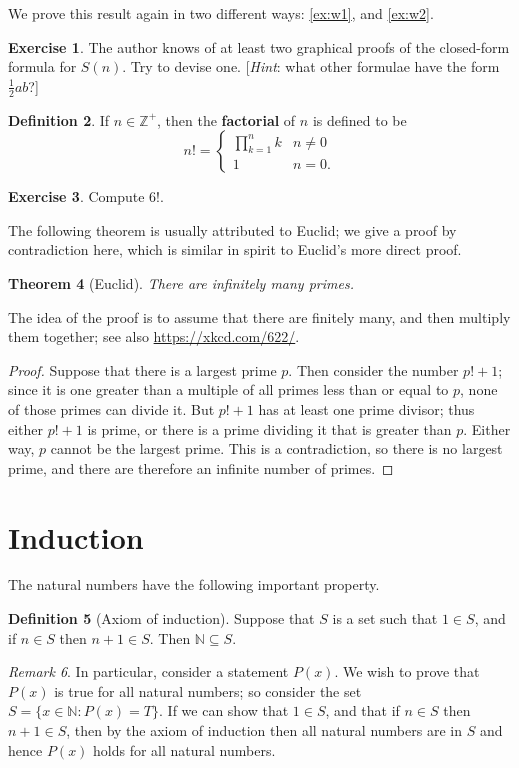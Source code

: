\documentclass[a4paper]{amsart}
\newtheorem{thm}{Theorem}[section]
\theoremstyle{definition}
\newtheorem{defn}[thm]{Definition}
\newtheorem{exercise}[thm]{Exercise}
\theoremstyle{remark}
\newtheorem{rem}[thm]{Remark}
\begin{document}
We prove this result again in two different ways: \cref{ex:w1}, and \cref{ex:w2}.

\begin{exercise}
  The author knows of at least two graphical proofs of the closed-form formula for $ S(n) $. Try to devise one. [\emph{Hint}: what other formulae
  have the form $ \frac{1}{2} ab $?]
\end{exercise}

\begin{defn}
  If $ n \in \mathbb{Z}^+ $, then the \textbf{factorial} of $ n $ is defined to be
  \begin{displaymath}
    n! = \begin{cases}
           \prod_{k = 1}^{n} k & n \neq 0\\
           1 & n = 0.
         \end{cases}
  \end{displaymath}
\end{defn}

\begin{exercise}
  Compute 6!.
\end{exercise}

The following theorem is usually attributed to Euclid; we give a proof by contradiction here, which is similar in spirit to Euclid's more direct proof.

\begin{thm}[Euclid]
  There are infinitely many primes.
\end{thm}
The idea of the proof is to assume that there are finitely many, and then multiply them together; see also \url{https://xkcd.com/622/}.
\begin{proof}
  Suppose that there is a largest prime $ p $. Then consider the number $ p! + 1 $; since it is one
  greater than a multiple of all primes less than or equal to $ p $, none of those primes can divide it.
  But $ p! + 1 $ has at least one prime divisor; thus either $ p! + 1 $ is prime, or there is a prime
  dividing it that is greater than $ p $. Either way, $ p $ cannot be the largest prime. This is a contradiction,
  so there is no largest prime, and there are therefore an infinite number of primes.
\end{proof}

\section{Induction}
The natural numbers have the following important property.
\begin{defn}[Axiom of induction]
  Suppose that $ S $ is a set such that $ 1 \in S $, and if $ n \in S $ then $ n + 1 \in S $.
  Then $ \mathbb{N} \subseteq S $.
\end{defn}
\begin{rem}
  In particular, consider a statement $ P(x) $. We wish to prove that $ P(x) $ is true
  for all natural numbers; so consider the set $ S = \{ x \in \mathbb{N} : P(x) = T \} $. If
  we can show that $ 1 \in S $, and that if $ n \in S $ then $ n + 1 \in S $, then by the axiom
  of induction then all natural numbers are in $ S $ and hence $ P(x) $ holds for all natural numbers.
\end{rem}
\end{document}
